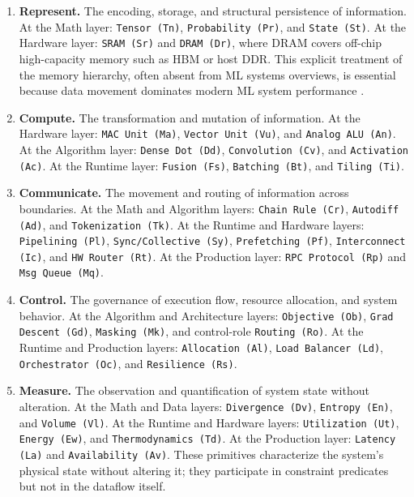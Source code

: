 \documentclass[10pt,twocolumn]{article}
\begin{document}
\begin{enumerate}[nosep, leftmargin=*]
\item \textbf{Represent.} The encoding, storage, and structural persistence of information. At the Math layer: \texttt{Tensor (Tn)}, \texttt{Probability (Pr)}, and \texttt{State (St)}. At the Hardware layer: \texttt{SRAM (Sr)} and \texttt{DRAM (Dr)}, where DRAM covers off-chip high-capacity memory such as HBM or host DDR. This explicit treatment of the memory hierarchy, often absent from ML systems overviews, is essential because data movement dominates modern ML system performance \citep{jouppi2017, ivanov2021data}.

\item \textbf{Compute.} The transformation and mutation of information. At the Hardware layer: \texttt{MAC Unit (Ma)}, \texttt{Vector Unit (Vu)}, and \texttt{Analog ALU (An)}. At the Algorithm layer: \texttt{Dense Dot (Dd)}, \texttt{Convolution (Cv)}, and \texttt{Activation (Ac)}. At the Runtime layer: \texttt{Fusion (Fs)}, \texttt{Batching (Bt)}, and \texttt{Tiling (Ti)}.

\item \textbf{Communicate.} The movement and routing of information across boundaries. At the Math and Algorithm layers: \texttt{Chain Rule (Cr)}, \texttt{Autodiff (Ad)}, and \texttt{Tokenization (Tk)}. At the Runtime and Hardware layers: \texttt{Pipelining (Pl)}, \texttt{Sync/Collective (Sy)}, \texttt{Prefetching (Pf)}, \texttt{Interconnect (Ic)}, and \texttt{HW Router (Rt)}. At the Production layer: \texttt{RPC Protocol (Rp)} and \texttt{Msg Queue (Mq)}.

\item \textbf{Control.} The governance of execution flow, resource allocation, and system behavior. At the Algorithm and Architecture layers: \texttt{Objective (Ob)}, \texttt{Grad Descent (Gd)}, \texttt{Masking (Mk)}, and control-role \texttt{Routing (Ro)}. At the Runtime and Production layers: \texttt{Allocation (Al)}, \texttt{Load Balancer (Ld)}, \texttt{Orchestrator (Oc)}, and \texttt{Resilience (Rs)}.

\item \textbf{Measure.} The observation and quantification of system state without alteration. At the Math and Data layers: \texttt{Divergence (Dv)}, \texttt{Entropy (En)}, and \texttt{Volume (Vl)}. At the Runtime and Hardware layers: \texttt{Utilization (Ut)}, \texttt{Energy (Ew)}, and \texttt{Thermodynamics (Td)}. At the Production layer: \texttt{Latency (La)} and \texttt{Availability (Av)}. These primitives characterize the system's physical state without altering it; they participate in constraint predicates but not in the dataflow itself.
\end{enumerate}
\end{document}
